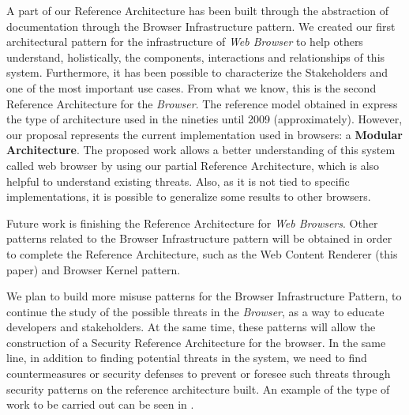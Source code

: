 \documentclass{sig-alternate-05-2015}
\begin{document}
A part of our Reference Architecture has been built through the abstraction of documentation through the Browser Infrastructure pattern. We created our first architectural pattern for the infrastructure of \textit{Web Browser} to help others understand, holistically, the components, interactions and relationships of this system. Furthermore, it has been possible to characterize the Stakeholders and one of the most important use cases. From what we know, this is the second Reference Architecture for the \textit{Browser}. The reference model obtained in \cite{2005-grosskurth-browser-refarch} express the type of architecture used in the nineties until 2009 (approximately). However, our proposal represents the current implementation used in browsers: a \textbf{Modular Architecture}. The proposed work allows a better understanding of this system called web browser by using our partial Reference Architecture, which is also helpful to understand existing threats. Also, as it is not tied to specific implementations, it is possible to generalize some results to other browsers. 

Future work is finishing the Reference Architecture for \textit{Web Browsers}. Other patterns related to the Browser Infrastructure pattern will be obtained in order to complete the Reference Architecture, such as the Web Content Renderer (this paper) and Browser Kernel pattern. 

We plan to build more \cite{silva2015b} misuse patterns for the Browser Infrastructure Pattern, to continue the study of the possible threats in the \textit{Browser}, as a way to educate developers and stakeholders. At the same time, these patterns will allow the construction of a Security Reference Architecture for the browser. In the same line, in addition to finding potential threats in the system, we need to find countermeasures or security defenses to prevent or foresee such threats through security patterns on the reference architecture built. An example of the type of work to be carried out can be seen in \cite{Fernandez2015}.


  

\end{document}
